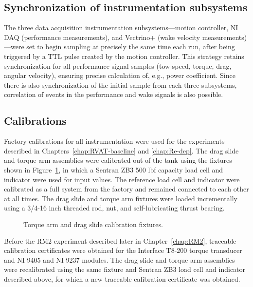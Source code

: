 \subsection{Synchronization of instrumentation subsystems}

The three data acquisition instrumentation subsystems---motion controller, NI
DAQ (performance measurements), and Vectrino+ (wake velocity
measurements)---were set to begin sampling at precisely the same time each run,
after being triggered by a TTL pulse created by the motion controller. This
strategy retains synchronization for all performance signal samples (tow speed,
torque, drag, angular velocity), ensuring precise calculation of, e.g., power
coefficient. Since there is also synchronization of the initial sample from each
three subsystems, correlation of events in the performance and wake signals is
also possible.


\subsection{Calibrations}

Factory calibrations for all instrumentation were used for the experiments
described in Chapters~\ref{chap:RVAT-baseline} and \ref{chap:Re-dep}. The drag
slide and torque arm assemblies were calibrated out of the tank using the
fixtures shown in Figure~\ref{fig:calibration-fixtures}, in which a Sentran ZB3
500 lbf capacity load cell and indicator were used for input values. The
reference load cell and indicator were calibrated as a full system from the
factory and remained connected to each other at all times. The drag slide and
torque arm fixtures were loaded incrementally using a 3/4-16 inch threaded rod,
nut, and self-lubricating thrust bearing.

\begin{figure}
    \caption{Torque arm and drag slide calibration fixtures.}
    
    \label{fig:calibration-fixtures}
\end{figure}

Before the RM2 experiment described later in Chapter~\ref{chap:RM2}, traceable
calibration certificates were obtained for the Interface T8-200 torque
transducer and NI 9405 and NI 9237 modules. The drag slide and torque arm
assemblies were recalibrated using the same fixture and Sentran ZB3 load cell
and indicator described above, for which a new traceable calibration certificate
was obtained.



